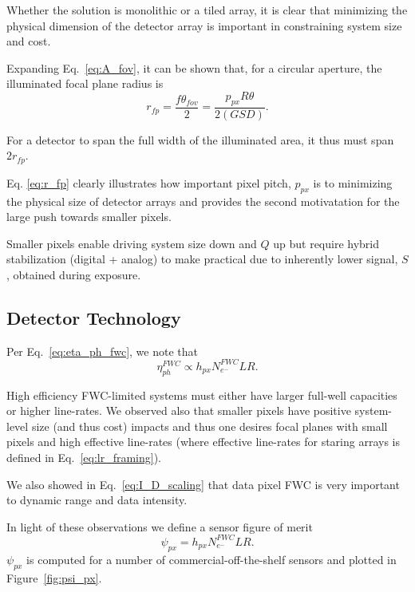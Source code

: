 \documentclass[10pt,journal]{IEEEtran}  %
\begin{document}
Whether the solution is monolithic or a tiled array, it is clear that minimizing the physical dimension of the detector array is important in constraining system size and cost.

Expanding Eq.~\eqref{eq:A_fov}, it can be shown that, for a circular aperture, the illuminated focal plane radius is
\begin{equation}
    \label{eq:r_fp}
    r_{fp} = \frac{f\theta_{fov}}{2} = \frac{p_{px}R\theta}{2 (GSD)}.
\end{equation}

For a detector to span the full width of the illuminated area, it thus must span $2 r_{fp}$. 

Eq. \eqref{eq:r_fp} clearly illustrates how important pixel pitch, $p_{px}$ is to minimizing the physical size of detector arrays and provides the second motivatation for the large push towards smaller pixels.

\begin{observation}
\label{obs:small_pix}
Smaller pixels enable driving system size down and $Q$ up but require hybrid stabilization (digital + analog) to make practical due to inherently lower signal, $S$, obtained during exposure.
\end{observation}

\subsection{Detector Technology}
\label{sec:detector_tech}

Per Eq.~\eqref{eq:eta_ph_fwc}, we note that 
\begin{equation}
    \eta_{ph}^{FWC} \propto h_{px}N_{e^-}^{FWC}LR.
\end{equation}

High efficiency FWC-limited systems must either have larger full-well capacities or higher line-rates.  We observed also that smaller pixels have positive system-level size (and thus cost) impacts and thus one desires focal planes with small pixels and high effective line-rates (where effective line-rates for staring arrays is defined in Eq.~\eqref{eq:lr_framing}).

We also showed in Eq.~\eqref{eq:I_D_scaling} that data pixel FWC is very important to dynamic range and data intensity.

In light of these observations we define a sensor figure of merit
\begin{equation}
    \psi_{px} = h_{px}N_{e^-}^{FWC}LR%
    \label{eq:psi_px}.
\end{equation}
$\psi_{px}$ is computed for a number of commercial-off-the-shelf sensors and plotted in Figure~\ref{fig:psi_px}.
\end{document}
